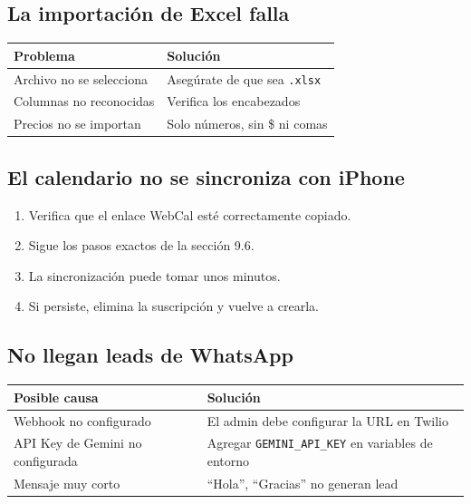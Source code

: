 \documentclass[12pt,oneside]{article}
\begin{document}
\subsection{La importación de Excel falla}

\begin{tabularx}{\textwidth}{|X|X|}
\hline
\rowcolor{primary!10}
\textbf{Problema} & \textbf{Solución} \\
\hline
Archivo no se selecciona & Asegúrate de que sea \texttt{.xlsx} \\
\hline
Columnas no reconocidas & Verifica los encabezados \\
\hline
Precios no se importan & Solo números, sin \$ ni comas \\
\hline
\end{tabularx}

\subsection{El calendario no se sincroniza con iPhone}

\begin{enumerate}[leftmargin=*]
  \item Verifica que el enlace WebCal esté correctamente copiado.
  \item Sigue los pasos exactos de la sección 9.6.
  \item La sincronización puede tomar unos minutos.
  \item Si persiste, elimina la suscripción y vuelve a crearla.
\end{enumerate}

\subsection{No llegan leads de WhatsApp}

\begin{tabularx}{\textwidth}{|X|X|}
\hline
\rowcolor{primary!10}
\textbf{Posible causa} & \textbf{Solución} \\
\hline
Webhook no configurado & El admin debe configurar la URL en Twilio \\
\hline
API Key de Gemini no configurada & Agregar \texttt{GEMINI\_API\_KEY} en variables de entorno \\
\hline
Mensaje muy corto & “Hola”, “Gracias” no generan lead \\
\hline
\end{tabularx}

\end{document}

